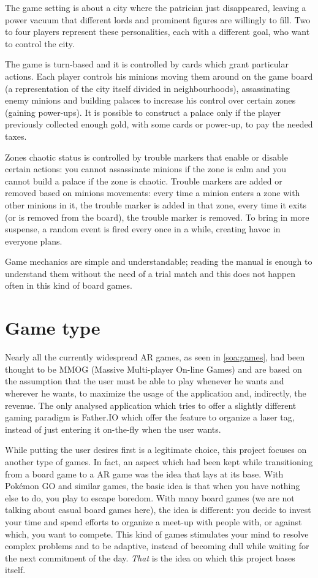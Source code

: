 		The game setting is about a city where the patrician just disappeared, leaving a power vacuum that different lords and prominent figures are willingly to fill.
		Two to four players represent these personalities, each with a different goal, who want to control the city.
		
		The game is turn-based and it is controlled by cards which grant particular actions.
		Each player controls his minions moving them around on the game board (a representation of the city itself divided in neighbourhoods), assassinating enemy minions and building palaces to increase his control over certain zones (gaining power-ups).
		It is possible to construct a palace only if the player previously collected enough gold, with some cards or power-up, to pay the needed taxes.
	
		Zones chaotic status is controlled by trouble markers that enable or disable certain actions: you cannot assassinate minions if the zone is calm and you cannot build a palace if the zone is chaotic. Trouble markers are added or removed based on minions movements: every time a minion enters a zone with other minions in it, the trouble marker is added in that zone, every time it exits (or is removed from the board), the trouble marker is removed.
		To bring in more suspense, a random event is fired every once in a while, creating havoc in everyone plans.
		
		Game mechanics are simple and understandable; reading the manual is enough to understand them without the need of a trial match and this does not happen often in this kind of board games.
	
	\section{Game type}
	
		Nearly all the currently widespread AR games, as seen in \autoref{soa:games}, had been thought to be MMOG (Massive Multi-player On-line Games) and are based on the assumption that the user must be able to play whenever he wants and wherever he wants, to maximize the usage of the application and, indirectly, the revenue.
		The only analysed application which tries to offer a slightly different gaming paradigm is Father.IO which offer the feature to organize a laser tag, instead of just entering it on-the-fly when the user wants.
		
		While putting the user desires first is a legitimate choice, this project focuses on another type of games.
		In fact, an aspect which had been kept while transitioning from a board game to a AR game was the idea that lays at its base.
		With Pokémon GO and similar games, the basic idea is that when you have nothing else to do, you play to escape boredom.
		With many board games (we are not talking about casual board games here), the idea is different: you decide to invest your time and spend efforts to organize a meet-up with people with, or against which, you want to compete.
		This kind of games stimulates your mind to resolve complex problems and to be adaptive, instead of becoming dull while waiting for the next commitment of the day. \emph{That} is the idea on which this project bases itself.
		
